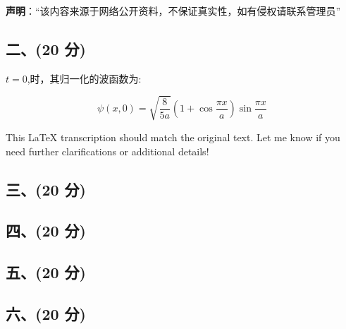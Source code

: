 
\textbf{声明}：“该内容来源于网络公开资料，不保证真实性，如有侵权请联系管理员”

\subsection{二、(20 分)}
 \( t = 0 \),时，其归一化的波函数为:

\[
\psi(x,0) = \sqrt{\frac{8}{5a}} (1 + \cos\frac{\pi x}{a}) \sin\frac{\pi x}{a}~
\]




This LaTeX transcription should match the original text. Let me know if you need further clarifications or additional details!
\subsection{三、(20 分)}

\subsection{四、(20 分)}

\subsection{五、(20 分)}

\subsection{六、(20 分)}